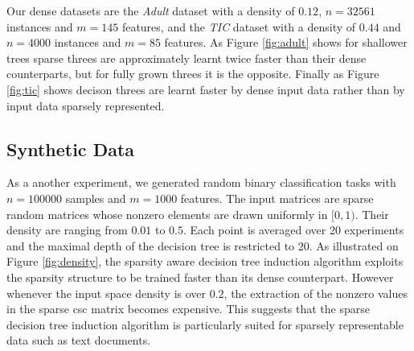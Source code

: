 Our dense datasets are the \emph{Adult} dataset\cite{Bache+Lichman:2013} with a density of $0.12$, $n=32561$ instances and  $m=145$ features, and the \emph{TIC} dataset\cite{Bache+Lichman:2013} with a density of $0.44$ and $n=4000$ instances and $m=85$ features. As Figure \ref{fig:adult} shows for shallower trees sparse threes are approximately learnt twice faster than their dense counterparts, but for fully grown threes it is the opposite. Finally as Figure \ref{fig:tic} shows decison threes are learnt faster by dense input data rather than by input data sparsely represented. 


\subsection{Synthetic Data}


As a another experiment, we generated random binary classification tasks with
$n=100000$ samples and $m=1000$ features. The input matrices are sparse random
matrices whose nonzero elements are drawn uniformly in $[0, 1)$. Their density
are ranging from $0.01$ to $0.5$. Each point is averaged over 20 experiments
and the maximal depth of the decision tree is restricted to 20. As illustrated
on Figure \ref{fig:density}, the sparsity aware decision tree induction
algorithm exploits the sparsity structure to be trained faster than its dense
counterpart. However whenever the input space density is over $0.2$, the
extraction of the nonzero values in the sparse csc matrix becomes expensive.
This suggests that the sparse decision tree induction algorithm is particularly
suited for sparsely representable data such as text documents.






